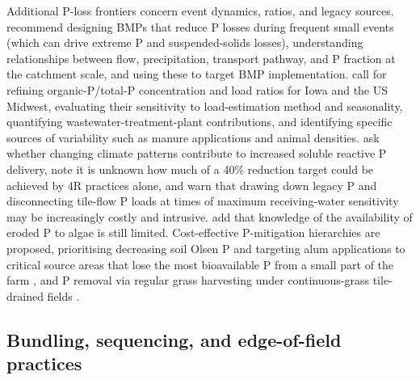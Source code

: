 Additional P-loss frontiers concern event dynamics, ratios, and legacy sources. \textcite{Brendel2019} recommend designing BMPs that reduce P losses during frequent small events (which can drive extreme P and suspended-solids losses), understanding relationships between flow, precipitation, transport pathway, and P fraction at the catchment scale, and using these to target BMP implementation. \textcite{Schilling2017b} call for refining organic-P/total-P concentration and load ratios for Iowa and the US Midwest, evaluating their sensitivity to load-estimation method and seasonality, quantifying wastewater-treatment-plant contributions, and identifying specific sources of variability such as manure applications and animal densities. \textcite{Jarvie2017} ask whether changing climate patterns contribute to increased soluble reactive P delivery, note it is unknown how much of a 40\% reduction target could be achieved by 4R practices alone, and warn that drawing down legacy P and disconnecting tile-flow P loads at times of maximum receiving-water sensitivity may be increasingly costly and intrusive. \textcite{Ulén2007} add that knowledge of the availability of eroded P to algae is still limited. Cost-effective P-mitigation hierarchies are proposed, prioritising decreasing soil Olsen P and targeting alum applications to critical source areas that lose the most bioavailable P from a small part of the farm \parencite{McDowell2015}, and P removal via regular grass harvesting under continuous-grass tile-drained fields \parencite{Zhang2015b}.

\subsection{Bundling, sequencing, and edge-of-field practices}

